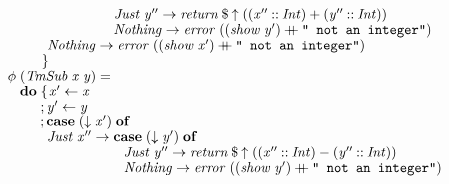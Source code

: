\documentclass[10pt]{article}
\newcommand{\Conid}[1]{\mathit{#1}}
\newcommand{\Varid}[1]{\mathit{#1}}
\newcommand{\plus}{\mathbin{+\!\!\!+}}
\begin{document}
\begin{tabbing}
${\hskip1.00em\relax\hskip2.00em\relax\phantom{\Varid{\phi}\;\mbox{}}\phantom{\mathbf{do}\;\mbox{}}\phantom{;\mbox{}}\phantom{\Conid{Just}\;\Varid{x''}\to \mbox{}}\Conid{Just}\;\Varid{y''}\to \Varid{return}\mathbin{\$}\Varid{\uparrow}\;((\Varid{x''}\mathbin{::}\Conid{Int})\mathbin{+}(\Varid{y''}\mathbin{::}\Conid{Int}))}$\\
${\hskip1.00em\relax\hskip2.00em\relax\phantom{\Varid{\phi}\;\mbox{}}\phantom{\mathbf{do}\;\mbox{}}\phantom{;\mbox{}}\phantom{\Conid{Just}\;\Varid{x''}\to \mbox{}}\Conid{Nothing}\to \Varid{error}\;((\Varid{show}\;\Varid{y'})\plus \text{\tt \char34 ~not~an~integer\char34})}$\\
${\hskip1.00em\relax\hskip2.00em\relax\phantom{\Varid{\phi}\;\mbox{}}\phantom{\mathbf{do}\;\mbox{}}\phantom{;\mbox{}}\Conid{Nothing}\to \Varid{error}\;((\Varid{show}\;\Varid{x'})\plus \text{\tt \char34 ~not~an~integer\char34})}$\\
${\hskip1.00em\relax\hskip2.00em\relax\phantom{\Varid{\phi}\;\mbox{}}\phantom{\mathbf{do}\;\mbox{}}\mskip1.5mu\}}$\\
${}$\\
${\hskip1.00em\relax\hskip2.00em\relax\Varid{\phi}\;(\Conid{TmSub}\;\Varid{x}\;\Varid{y})\mathrel{=}}$\\
${\hskip1.00em\relax\hskip2.00em\relax\phantom{\Varid{\phi}\;\mbox{}}\mathbf{do}\;\{\mskip1.5mu \Varid{x'}\leftarrow \Varid{x}}$\\
${\hskip1.00em\relax\hskip2.00em\relax\phantom{\Varid{\phi}\;\mbox{}}\phantom{\mathbf{do}\;\mbox{}};\Varid{y'}\leftarrow \Varid{y}}$\\
${\hskip1.00em\relax\hskip2.00em\relax\phantom{\Varid{\phi}\;\mbox{}}\phantom{\mathbf{do}\;\mbox{}};\mathbf{case}\;(\Varid{\downarrow}\;\Varid{x'})\;\mathbf{of}}$\\
${\hskip1.00em\relax\hskip2.00em\relax\phantom{\Varid{\phi}\;\mbox{}}\phantom{\mathbf{do}\;\mbox{}}\phantom{;\mbox{}}\Conid{Just}\;\Varid{x''}\to \mathbf{case}\;(\Varid{\downarrow}\;\Varid{y'})\;\mathbf{of}}$\\
${\hskip1.00em\relax\hskip2.00em\relax\phantom{\Varid{\phi}\;\mbox{}}\phantom{\mathbf{do}\;\mbox{}}\phantom{;\mbox{}}\hskip5.50em\relax\Conid{Just}\;\Varid{y''}\to \Varid{return}\mathbin{\$}\Varid{\uparrow}\;((\Varid{x''}\mathbin{::}\Conid{Int})\mathbin{-}(\Varid{y''}\mathbin{::}\Conid{Int}))}$\\
${\hskip1.00em\relax\hskip2.00em\relax\phantom{\Varid{\phi}\;\mbox{}}\phantom{\mathbf{do}\;\mbox{}}\phantom{;\mbox{}}\hskip5.50em\relax\Conid{Nothing}\to \Varid{error}\;((\Varid{show}\;\Varid{y'})\plus \text{\tt \char34 ~not~an~integer\char34})}$\\

\end{tabbing}
\end{document}
